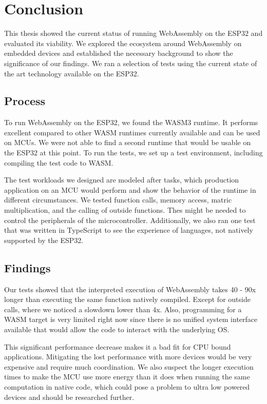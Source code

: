 
\chapter{Conclusion}\label{chapter:conclusion}

This thesis showed the current status of running WebAssembly on the ESP32 and evaluated its viability. We explored the ecosystem around WebAssembly on embedded devices and established the necessary background to show the significance of our findings. We ran a selection of tests using the current state of the art technology available on the ESP32.

\section*{Process}

To run WebAssembly on the ESP32, we found the WASM3 runtime. It performs excellent compared to other WASM runtimes currently available and can be used on MCUs. We were not able to find a second runtime that would be usable on the ESP32 at this point. To run the tests, we set up a test environment, including compiling the test code to WASM.

The test workloads we designed are modeled after tasks, which production application on an MCU would perform and show the behavior of the runtime in different circumstances. We tested function calls, memory access, matric multiplication, and the calling of outside functions. Thes might be needed to control the peripherals of the microcontroller. Additionally, we also ran one test that was written in TypeScript to see the experience of languages, not natively supported by the ESP32.

\section*{Findings}

Our tests showed that the interpreted execution of WebAssembly takes 40 - 90x longer than executing the same function natively compiled. Except for outside calls, where we noticed a slowdown lower than 4x. Also, programming for a WASM target is very limited right now since there is no unified system interface available that would allow the code to interact with the underlying OS.

This significant performance decrease makes it a bad fit for CPU bound applications. Mitigating the lost performance with more devices would be very expensive and require much coordination. We also suspect the longer execution times to make the MCU use more energy than it does when running the same computation in native code, which could pose a problem to ultra low powered devices and should be researched further.

